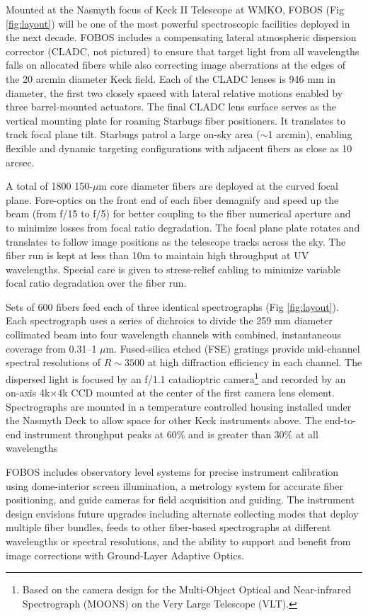 Mounted at the Nasmyth focus of Keck II Telescope at WMKO, FOBOS (Fig
\ref{fig:layout}) will be one of the most powerful spectroscopic
facilities deployed in the next decade.  FOBOS includes a compensating lateral
atmospheric dispersion corrector (CLADC, not pictured) to ensure that
target light from all wavelengths falls on allocated fibers while also
correcting image aberrations at the edges of the 20 arcmin diameter Keck
field.  Each of the CLADC lenses is 946 mm in diameter, the first two
closely spaced with lateral relative motions enabled by three
barrel-mounted actuators.  The final CLADC lens surface serves as the
vertical mounting plate for roaming Starbugs fiber positioners.  It
translates to track focal plane tilt.  Starbugs patrol a large on-sky
area ($\sim$1 arcmin), enabling flexible and dynamic targeting
configurations with adjacent fibers as close as 10 arcsec.

A total of 1800 150-$\mu$m core diameter fibers are deployed at the curved focal plane.  Fore-optics on the front end
of each fiber demagnify and speed up the beam (from f/15 to f/5) for better coupling to the fiber numerical aperture
and to minimize losses from focal ratio degradation.  The focal plane plate rotates and translates to follow image
positions as the telescope tracks across the sky.  The fiber run is kept at less than 10m to maintain high throughput
at UV wavelengths.  Special care is given to stress-relief cabling to minimize variable focal ratio degradation over
the fiber run.

Sets of 600 fibers feed each of three identical spectrographs (Fig
\ref{fig:layout}).  Each spectrograph uses a series of dichroics to
divide the 259 mm diameter collimated beam into four wavelength channels with combined, instantaneous
coverage from 0.31--1 $\mu$m.  Fused-silica etched (FSE) gratings provide mid-channel spectral resolutions of $R
\sim 3500$ at high diffraction efficiency in each channel.  The dispersed light is focused by an f/1.1
catadioptric camera\footnote{Based on the camera design for the Multi-Object Optical and Near-infrared Spectrograph (MOONS) on the Very Large Telescope (VLT).} and recorded by an on-axis 4k$\times$4k CCD mounted
at the center of the first camera lens element.  Spectrographs are
mounted in a temperature controlled housing installed under the Nasmyth
Deck to allow space for other Keck instruments above.  The end-to-end
instrument throughput peaks at 60\% and is greater than 30\% at all wavelengths

FOBOS includes observatory level systems for precise instrument
calibration using dome-interior screen illumination, a metrology system
for accurate fiber positioning, and guide cameras for field acquisition
and guiding.  The instrument design envisions future upgrades including
alternate collecting modes that deploy multiple fiber bundles, feeds to
other fiber-based spectrographs at different wavelengths or spectral
resolutions, and the ability to support and benefit from image
corrections with Ground-Layer Adaptive Optics.
